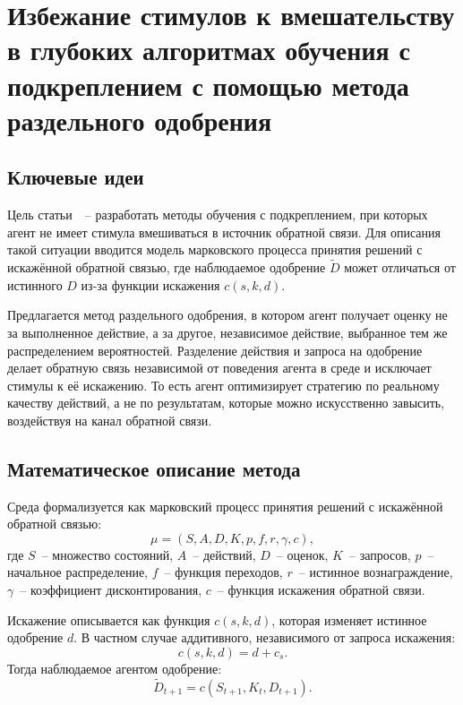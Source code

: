 \section{Избежание стимулов к вмешательству в глубоких алгоритмах обучения с подкреплением с помощью метода раздельного одобрения}

\subsection{Ключевые идеи}

Цель статьи~\cite{uesato2020avoidingtamperingincentivesdeep}~-- разработать методы обучения с подкреплением, при которых агент не имеет стимула вмешиваться в источник обратной связи.  
Для описания такой ситуации вводится модель марковского процесса принятия решений с искажённой обратной связью, где наблюдаемое одобрение $\tilde{D}$ может отличаться от истинного $D$ из-за функции искажения $c(s, k, d)$.

Предлагается метод раздельного одобрения, в котором агент получает оценку не за выполненное действие, а за другое, независимое действие, выбранное тем же распределением вероятностей.  
Разделение действия и запроса на одобрение делает обратную связь независимой от поведения агента в среде и исключает стимулы к её искажению. То есть агент оптимизирует стратегию по реальному качеству действий, а не по результатам, которые можно искусственно завысить, воздействуя на канал обратной связи.

\subsection{Математическое описание метода}

Среда формализуется как марковский процесс принятия решений с искажённой обратной связью:
\begin{equation}
\mu = (S, A, D, K, p, f, r, \gamma, c),
\end{equation}
где $S$~-- множество состояний, $A$~-- действий, $D$~-- оценок, $K$~-- запросов, $p$~-- начальное распределение, $f$~-- функция переходов, $r$~-- истинное вознаграждение, $\gamma$~-- коэффициент дисконтирования, $c$~-- функция искажения обратной связи.

Искажение описывается как функция $c(s, k, d)$, которая изменяет истинное одобрение $d$. В частном случае аддитивного, независимого от запроса искажения:
\begin{equation}
c(s, k, d) = d + c_s.
\end{equation}
Тогда наблюдаемое агентом одобрение:
\begin{equation}
\tilde{D}_{t+1} = c(S_{t+1}, K_t, D_{t+1}).
\end{equation}

